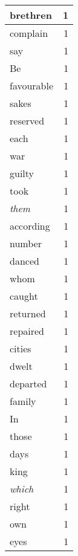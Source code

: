 \begin{center}
\begin{longtable}{l|r}
brethren & 1 \\ \hline
complain & 1 \\ \hline
say & 1 \\ \hline
Be & 1 \\ \hline
favourable & 1 \\ \hline
sakes & 1 \\ \hline
reserved & 1 \\ \hline
each & 1 \\ \hline
war & 1 \\ \hline
guilty & 1 \\ \hline
took & 1 \\ \hline
\emph{them} & 1 \\ \hline
according & 1 \\ \hline
number & 1 \\ \hline
danced & 1 \\ \hline
whom & 1 \\ \hline
caught & 1 \\ \hline
returned & 1 \\ \hline
repaired & 1 \\ \hline
cities & 1 \\ \hline
dwelt & 1 \\ \hline
departed & 1 \\ \hline
family & 1 \\ \hline
In & 1 \\ \hline
those & 1 \\ \hline
days & 1 \\ \hline
king & 1 \\ \hline
\emph{which} & 1 \\ \hline
right & 1 \\ \hline
own & 1 \\ \hline
eyes & 1 \\ \hline
\end{longtable}
\end{center}



\normalsize




